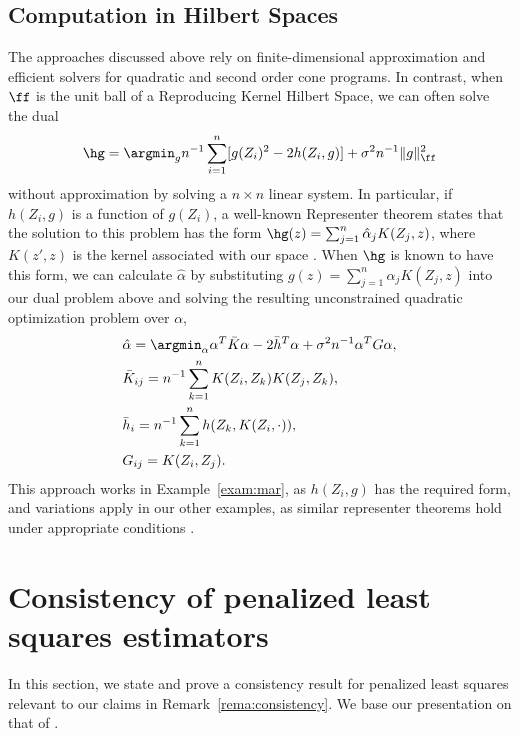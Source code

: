 \subsection{Computation in Hilbert Spaces}
The approaches discussed above rely on finite-dimensional approximation and efficient solvers for quadratic and second order cone programs.
In contrast, when $\ff$ is the unit ball of a Reproducing Kernel Hilbert Space, we can often solve the dual 
\[ \hg = \argmin_g n^{-1}\sum_{i=1}^n [g(Z_i)^2 - 2 h(Z_i, g)] + \sigma^2 n^{-1}\norm{g}_{\ff}^2 \]
without approximation by solving a $n \times n$ linear system. In particular, if $h(Z_i, g)$ is a function of $g(Z_i)$,
a well-known Representer theorem  states that the solution to this problem
has the form $\hg(z) = \sum_{j=1}^n \hat\alpha_j K(Z_j,z)$, where $K(z',z)$ is the kernel 
associated with our space \citep{scholkopf2001generalized}.
 When $\hg$ is known to have this form, we can calculate $\hat\alpha$ by substituting $g(z)=\sum_{j=1}^n \alpha_j K(Z_j, z)$
into our dual problem above and solving the resulting unconstrained quadratic optimization problem over $\alpha$,
\begin{align*} 
&\hat \alpha = \argmin_\alpha \alpha^T \bar K \alpha - 2 \bar h^T \alpha + \sigma^2 n^{-1} \alpha^T G \alpha, \\
&\bar{K}_{ij} = n^{-1}\sum_{k=1}^n K(Z_i, Z_k) K(Z_j,Z_k), \\ 
&\bar h_i = n^{-1}\sum_{k=1}^n h(Z_k, K(Z_i,\cdot)),\\
& G_{ij} = K(Z_i,Z_j).
\end{align*}
This approach works in Example~\ref{exam:mar}, as $h(Z_i,g)$ has the required form,
and variations apply in our other examples, 
as similar representer theorems hold under appropriate conditions \citep[see e.g.][]{argyriou2014unifying}.


\section{Consistency of penalized least squares estimators}
\label{appendix:penalized-least-squares}
In this section, we state and prove a consistency result for penalized least squares 
relevant to our claims in Remark~\ref{rema:consistency}. We base our presentation 
on that of \citet{lecue2017regularization}.


